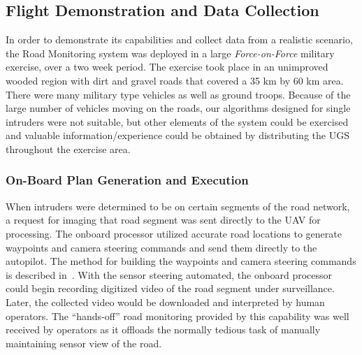 \documentclass[letterpaper, 12 pt, conference]{ieeeconf}  %
\theoremstyle{definition}
\begin{document}
\subsection{Flight Demonstration and Data Collection}
In order to demonstrate its capabilities and collect data from a realistic scenario, the Road Monitoring system was deployed in a large \emph{Force-on-Force} military exercise, over a two week period. The exercise took place in an unimproved wooded region with dirt and gravel roads that covered a 35 km by 60 km area. There were many military type vehicles as well as ground troops. Because of the large number of vehicles moving on the roads, our algorithms designed for single intruders were not suitable, but other elements of the system could be exercised and valuable information/experience could be obtained by distributing the UGS throughout the exercise area.  

\subsubsection{On-Board Plan Generation and Execution}
When intruders were determined to be on certain segments of the road network, a request for imaging that road segment was sent directly to the UAV for processing. The onboard processor utilized accurate road locations to generate waypoints and camera steering commands and send them directly to the autopilot. The method for building the waypoints and camera steering commands is described in~\cite{kingstonSPIE09}. With the sensor steering automated, the onboard processor could begin recording digitized video of the road segment under surveillance. Later, the collected video would be downloaded and interpreted by human operators. The ``hands-off'' road monitoring provided by this capability was well received by operators as it offloads the normally tedious task of manually maintaining sensor view of the road.
\end{document}
